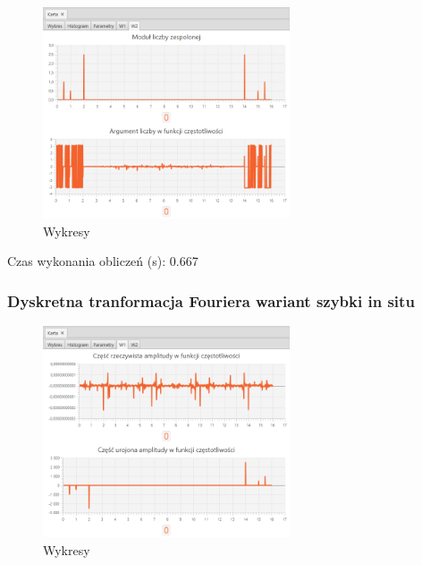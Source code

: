 \documentclass[12pt]{article}
\begin{document}
{{{                \begin{figure}[H]
                    \centering
                    \includegraphics[width=0.65\textwidth]{img/result/s2/01/W2_draw_1_sinus_sampling_trans_s2_data_205737.png}
                    \caption{Wykresy}
                \end{figure}

                Czas wykonania obliczeń (s): 0.667
            }
            \newpage

            \subsubsection{Dyskretna tranformacja Fouriera wariant szybki in situ} {

                \begin{figure}[H]
                    \centering
                    \includegraphics[width=0.65\textwidth]{img/result/s2/02/W1_draw_2_sinus_sampling_trans_s2_data_205743.png}
                    \caption{Wykresy}
                \end{figure}

}}}
\end{document}
